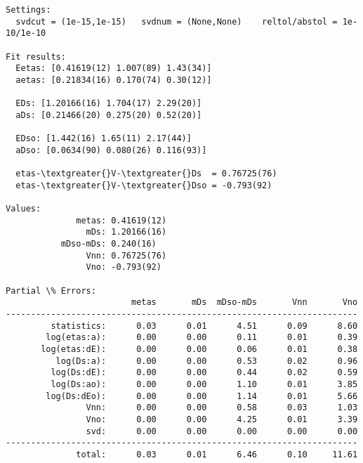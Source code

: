 \documentclass[letterpaper,10pt,english]{sphinxmanual}
\begin{document}
\begin{Verbatim}[commandchars=\\\{\}]
Settings:
  svdcut = (1e-15,1e-15)   svdnum = (None,None)    reltol/abstol = 1e-10/1e-10

Fit results:
  Eetas: [0.41619(12) 1.007(89) 1.43(34)]
  aetas: [0.21834(16) 0.170(74) 0.30(12)]

  EDs: [1.20166(16) 1.704(17) 2.29(20)]
  aDs: [0.21466(20) 0.275(20) 0.52(20)]

  EDso: [1.442(16) 1.65(11) 2.17(44)]
  aDso: [0.0634(90) 0.080(26) 0.116(93)]

  etas-\textgreater{}V-\textgreater{}Ds  = 0.76725(76)
  etas-\textgreater{}V-\textgreater{}Dso = -0.793(92)

Values:
              metas: 0.41619(12)         
                mDs: 1.20166(16)         
           mDso-mDs: 0.240(16)           
                Vnn: 0.76725(76)         
                Vno: -0.793(92)          

Partial \% Errors:
                         metas       mDs  mDso-mDs       Vnn       Vno
----------------------------------------------------------------------
         statistics:      0.03      0.01      4.51      0.09      8.60
        log(etas:a):      0.00      0.00      0.11      0.01      0.39
       log(etas:dE):      0.00      0.00      0.06      0.01      0.38
          log(Ds:a):      0.00      0.00      0.53      0.02      0.96
         log(Ds:dE):      0.00      0.00      0.44      0.02      0.59
         log(Ds:ao):      0.00      0.00      1.10      0.01      3.85
        log(Ds:dEo):      0.00      0.00      1.14      0.01      5.66
                Vnn:      0.00      0.00      0.58      0.03      1.03
                Vno:      0.00      0.00      4.25      0.01      3.39
                svd:      0.00      0.00      0.00      0.00      0.00
----------------------------------------------------------------------
              total:      0.03      0.01      6.46      0.10     11.61
\end{Verbatim}
\end{document}
